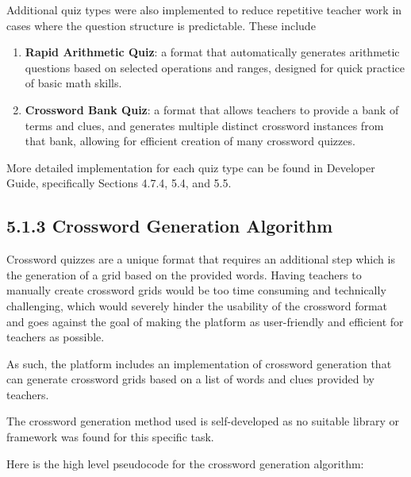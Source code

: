 \documentclass[
  12pt,
  a4paper,
]{report}
\begin{document}
Additional quiz types were also implemented to reduce repetitive teacher
work in cases where the question structure is predictable. These include

\begin{enumerate}
  \item \textbf{Rapid Arithmetic Quiz}: a format that automatically generates arithmetic questions based on
  selected operations and ranges, designed for quick practice of basic math skills.
  \item \textbf{Crossword Bank Quiz}: a format that allows teachers to provide a bank of terms and clues,
  and generates multiple distinct crossword instances from that bank, allowing for efficient creation of many crossword quizzes.
\end{enumerate}

More detailed implementation for each quiz type can be found in
Developer Guide, specifically Sections 4.7.4, 5.4, and 5.5.

\hypertarget{generating-of-crossword-puzzles}{%
\subsection{5.1.3 Crossword Generation Algorithm}\label{generating-of-crossword-puzzles}}

Crossword quizzes are a unique format that requires an additional step which is
the generation of a grid based on the provided words. Having teachers to
manually create crossword grids would be too time consuming and technically
challenging, which would severely hinder the usability of the crossword format and goes
against the goal of making the platform as user-friendly and efficient for teachers as possible.

As such, the platform includes an implementation of crossword generation that can generate
crossword grids based on a list of words and clues provided by teachers.

The crossword generation method used is self-developed as no suitable library
or framework was found for this specific task.

Here is the high level pseudocode for the crossword generation algorithm:
\vspace{0.5cm}
\end{document}
